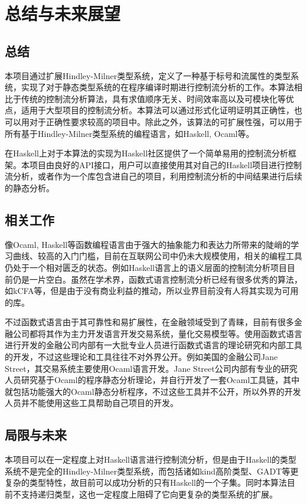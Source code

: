 \documentclass[12pt, titlepage]{article}
\begin{document}
	\section{总结与未来展望}
	\subsection{总结}
	本项目通过扩展Hindley-Milner类型系统，定义了一种基于标号和流属性的类型系统，实现了对于静态类型系统的在程序编译时期进行控制流分析的工作。本算法相比于传统的控制流分析算法，具有求值顺序无关、时间效率高以及可模块化等优点，适用于大型项目的控制流分析。本算法可以通过形式化证明证明其正确性，也可以用对于正确性要求较高的项目中。除此之外，该算法的可扩展性强，可以用于所有基于Hindley-Milner类型系统的编程语言，如Haskell, Ocaml等。
	
	在Haskell上对于本算法的实现为Haskell社区提供了一个简单易用的控制流分析框架。本项目由良好的API接口，用户可以直接使用其对自己的Haskell项目进行控制流分析，或者作为一个库包含进自己的项目，利用控制流分析的中间结果进行后续的静态分析。
	\subsection{相关工作}
	像Ocaml, Haskell等函数编程语言由于强大的抽象能力和表达力所带来的陡峭的学习曲线、较高的入门门槛，目前在互联网公司中仍未大规模使用，相关的编程工具仍处于一个相对匮乏的状态。例如Haskell语言上的语义层面的控制流分析项目目前仍是一片空白。虽然在学术界，函数式语言控制流分析已经有很多优秀的算法，如kCFA等，但是由于没有商业利益的推动，所以业界目前没有人将其实现为可用的库。
	
	不过函数式语言由于其可靠性和易扩展性，在金融领域受到了青睐，目前有很多金融公司都将其作为主力开发语言开发交易系统，量化交易模型等。使用函数式语言进行开发的金融公司内部有一大批专业人员进行函数式语言的理论研究和内部工具的开发，不过这些理论和工具往往不对外界公开。例如美国的金融公司Jane Street，其交易系统主要使用Ocaml语言开发。Jane Street公司内部有专业的研究人员研究基于Ocaml的程序静态分析理论，并自行开发了一套Ocaml工具链，其中就包括功能强大的Ocaml静态分析程序，不过这些工具并不公开，所以外界的开发人员并不能使用这些工具帮助自己项目的开发。
	\subsection{局限与未来}
	本项目可以在一定程度上对Haskell语言进行控制流分析，但是由于Haskell的类型系统不是完全的Hindley-Milner类型系统，而包括诸如kind高阶类型、GADT等更复杂的类型特性，故目前可以成功分析的只有Haskell的一个子集。同时本算法目前不支持递归类型，这也一定程度上阻碍了它向更复杂的类型系统的扩展。
	
\end{document}
